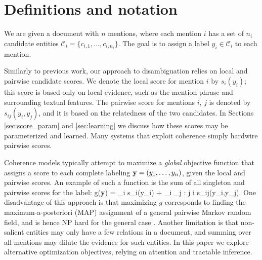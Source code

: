 \section{Definitions and notation}
\label{sec:notation}

We are given a document with $n$ mentions, where each mention $i$ has a set of $n_i$ candidate entities $\mathcal{C}_i = \{c_{i,1}, ..., c_{i,n_i}\}$. The goal is to assign a label $y_i \in \mathcal{C}_i$ to each mention.

Similarly to previous work, our approach to disambiguation relies on local and pairwise candidate scores. We denote the local score for mention $i$ by $s_i(y_i)$; this score is based only on local evidence, such as the mention phrase and surrounding textual features. The pairwise score for mentions $i$, $j$ is denoted by $s_{ij}(y_i, y_j)$,  and it is based on the relatedness of the two candidates. In Sections \ref{sec:score_param} and \ref{sec:learning} we discuss how these scores may be parameterized and learned.  Many systems that exploit coherence \cite{Cucerzan07,Milne2008,KulkarniSRC09} simply hardwire pairwise scores.


Coherence models typically attempt to maximize a {\em global} objective function that assigns a score to each complete labeling ${\bf y} = (y_1,\ldots, y_n)$, given the local and pairwise scores. An example of such a function is the sum of all singleton and pairwise scores for the label:
\be
g({\bf y}) = \sum_i s_i(y_i) + \sum_i \sum_{j :  j \neq i} s_{ij}(y_i,y_j).
\label{eq:global_obj}
\ee 
One disadvantage of this approach is that maximizing $g$ corresponds to finding the maximum-a-posteriori (MAP) assignment of a general pairwise Markov random field, and is hence
NP hard for the general case \cite{wainwright2008graphical}. Another limitation is that non-salient entities may only have a few relations in a document, and summing over all mentions may dilute the evidence for such entities. In this paper we explore alternative optimization objectives, relying on attention and tractable inference.



